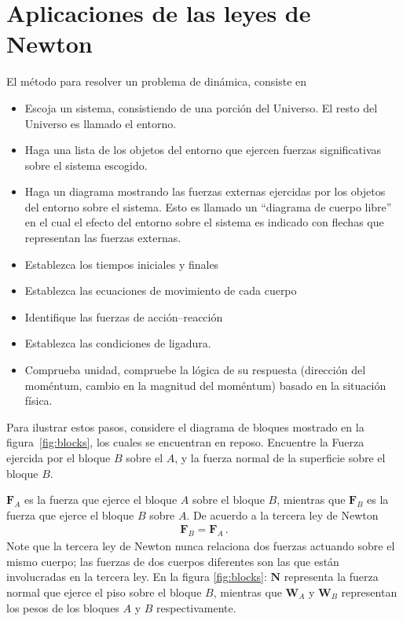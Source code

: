 \section{Aplicaciones de las leyes de Newton}
El método para resolver un problema de din\'amica, consiste en
\begin{itemize}
\item Escoja un sistema, consistiendo de una porción del Universo. El resto del Universo es llamado el entorno.
\item Haga una lista de los objetos del entorno que ejercen fuerzas significativas sobre el sistema escogido. 
\item Haga un diagrama mostrando las fuerzas externas ejercidas por los objetos del entorno sobre el sistema. Esto es llamado un ``diagrama de cuerpo libre'' en el cual el efecto del entorno sobre el sistema es indicado con flechas que representan las fuerzas externas.
\item Establezca los tiempos iniciales y finales
\item Establezca las ecuaciones de movimiento de cada cuerpo
\item Identifique las fuerzas de acci\'on--reacci\'on
\item Establezca las condiciones de ligadura.
\item Comprueba unidad, compruebe la lógica de su respuesta (dirección del moméntum, cambio en la magnitud del moméntum) basado en la situación física.
\end{itemize}

 

Para ilustrar estos pasos, considere el diagrama de bloques mostrado en la figura~\ref{fig:blocks}, los cuales se encuentran en reposo. Encuentre la Fuerza ejercida por el bloque $B$ sobre el $A$, y la fuerza normal de la superficie sobre el bloque $B$.


 $\mathbf{F}_A$ es la fuerza que ejerce el bloque $A$ sobre el bloque $B$, mientras que $\mathbf{F}_B$ es la fuerza que ejerce el bloque $B$ sobre $A$. De acuerdo a la tercera ley de Newton
\begin{align}
  \mathbf{F}_B=\mathbf{F}_A\,.
\end{align}
Note que la tercera ley de Newton nunca relaciona dos fuerzas actuando sobre el mismo cuerpo; las fuerzas de dos cuerpos diferentes son las que est\'an involucradas en la tercera ley. En la figura \ref{fig:blocks}: $\mathbf{N}$ representa la fuerza normal que ejerce el piso sobre el bloque $B$, mientras que $\mathbf{W}_A$ y $\mathbf{W}_B$ representan los pesos de los bloques $A$ y $B$ respectivamente. 


